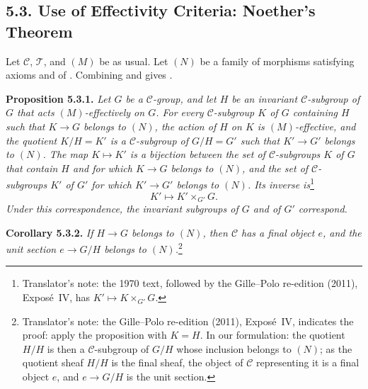 \subsection*{5.3. Use of Effectivity Criteria: Noether's Theorem}
Let \(\mathscr C\), \(\mathcal T\), and \((M)\) be as usual. Let \((N)\)
be a family of morphisms satisfying axioms  and  of .
Combining  and  gives .

\medskip
\noindent{}\textbf{Proposition 5.3.1.}
\textit{Let \(G\) be a \(\mathscr C\)-group, and let \(H\) be an invariant
\(\mathscr C\)-subgroup of \(G\) that acts \((M)\)-effectively on \(G\).
For every \(\mathscr C\)-subgroup \(K\) of \(G\) containing \(H\) such
that \(K\to G\) belongs to \((N)\), the action of \(H\) on \(K\) is
\((M)\)-effective, and the quotient \(K/H=K'\) is a
\(\mathscr C\)-subgroup of \(G/H=G'\) such that \(K'\to G'\) belongs to
\((N)\). The map \(K\mapsto K'\) is a bijection between the set of
\(\mathscr C\)-subgroups \(K\) of \(G\) that contain \(H\) and for which
\(K\to G\) belongs to \((N)\), and the set of \(\mathscr C\)-subgroups
\(K'\) of \(G'\) for which \(K'\to G'\) belongs to \((N)\). Its inverse
is}\footnote{Translator's note: the 1970 text, followed by the
Gille--Polo re-edition (2011), Expos\'e~IV, has \(K'\mapsto K\times_{G'}G\).}
\[
  K'\longmapsto K'\times_{G'}G.
\]
\textit{Under this correspondence, the invariant subgroups of \(G\) and
of \(G'\) correspond.}

\medskip
\noindent{}\textbf{Corollary 5.3.2.}
\textit{If \(H\to G\) belongs to \((N)\), then \(\mathscr C\) has a final
object \(e\), and the unit section \(e\to G/H\) belongs to
\((N)\).}\footnote{Translator's note: the Gille--Polo re-edition (2011), Expos\'e~IV, indicates
the proof: apply the proposition with \(K=H\). In our formulation: the
quotient \(H/H\) is then a \(\mathscr C\)-subgroup of \(G/H\) whose inclusion
belongs to \((N)\); as the quotient sheaf \(H/H\) is the final sheaf, the
object of \(\mathscr C\) representing it is a final object \(e\), and
\(e\to G/H\) is the unit section.}
